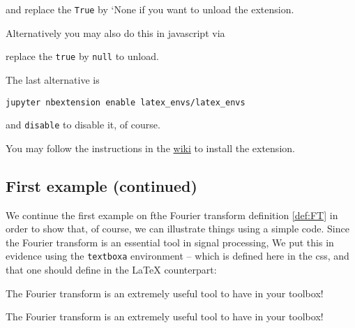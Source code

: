     and replace the \texttt{True} by `None if you want to unload the
extension.

Alternatively you may also do this in javascript via

\begin{Shaded}
\end{Shaded}

    replace the \texttt{true} by \texttt{null} to unload.

The last alternative is

\begin{verbatim}
jupyter nbextension enable latex_envs/latex_envs
\end{verbatim}

    and \texttt{disable} to disable it, of course.

    You may follow the instructions in the
\href{https://github.com/ipython-contrib/jupyter_contrib_nbextensions/wiki}{wiki}
to install the extension.

    \subsection{First example (continued)}\label{first-example-continued}

    We continue the first example on fthe Fourier transform definition
\ref{def:FT} in order to show that, of course, we can illustrate things
using a simple code. Since the Fourier transform is an essential tool in
signal processing, We put this in evidence using the \texttt{textboxa}
environment -- which is defined here in the css, and that one should
define in the LaTeX counterpart:

\begin{listing}
\begin{textboxa}
The Fourier transform is an extremely useful tool to have in your toolbox!
\end{textboxa}
\end{listing}

    \begin{textboxa}
The Fourier transform is an extremely useful tool to have in your toolbox!
\end{textboxa}

